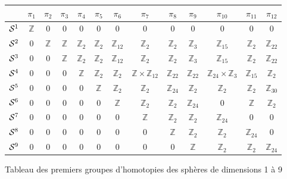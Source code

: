 \begin{figure}[H]
    \centering
    \small
    \begin{tabular}{|c|c|c|c|c|c|c|c|c|c|c|c|c|}
\hline
 & $\pi_1$ & $\pi_2$ & $\pi_3$ & $\pi_4$ & $\pi_5$ & $\pi_6$ & $\pi_7$ & $\pi_8$ & $\pi_9$ & $\pi_{10}$ & $\pi_{11}$ & $\pi_{12}$ \\
\hline
$\mathcal{S}^{1}$ & $\mathbb{Z}$ & $0$ & $0$ & $0$ & $0$ & $0$ & $0$ & $0$ & $0$ & $0$ & $0$ & $0$\\
\hline
$\mathcal{S}^{2}$ & $0$ & $\mathbb{Z}$ & $\mathbb{Z}$ & $\mathbb{Z}_2$ & $\mathbb{Z}_2$ & $\mathbb{Z}_{12}$ & $\mathbb{Z}_2$ & $\mathbb{Z}_2$ & $\mathbb{Z}_3$ & $\mathbb{Z}_{15}$ & $\mathbb{Z}_2$ & $\mathbb{Z}_{22}$ \\
\hline
$\mathcal{S}^{3}$ & $0$ & $0$ & $\mathbb{Z}$ & $\mathbb{Z}_2$ & $\mathbb{Z}_2$ & $\mathbb{Z}_{12}$ & $\mathbb{Z}_2$ & $\mathbb{Z}_2$ & $\mathbb{Z}_3$ & $\mathbb{Z}_{15}$ & $\mathbb{Z}_2$ & $\mathbb{Z}_{22}$ \\
\hline
$\mathcal{S}^{4}$ & $0$ & $0$ & $0$ & $\mathbb{Z}$ & $\mathbb{Z}_2$ & $\mathbb{Z}_2$ & $\mathbb{Z} \times \mathbb{Z}_{12}$ & $\mathbb{Z}_{22}$ & $\mathbb{Z}_{22}$ & $\mathbb{Z}_{24} \times \mathbb{Z}_3$ & $\mathbb{Z}_{15}$ & $\mathbb{Z}_2$ \\
\hline
$\mathcal{S}^{5}$ & $0$ & $0$ & $0$ & $0$ & $\mathbb{Z}$ & $\mathbb{Z}_2$ & $\mathbb{Z}_2$ & $\mathbb{Z}_{24}$ & $\mathbb{Z}_2$ & $\mathbb{Z}_2$ & $\mathbb{Z}_2$ & $\mathbb{Z}_{30}$ \\
\hline
$\mathcal{S}^{6}$ & $0$ & $0$ & $0$ & $0$ & $0$ & $\mathbb{Z}$ & $\mathbb{Z}_2$ & $\mathbb{Z}_2$ & $\mathbb{Z}_{24}$ & $0$ & $\mathbb{Z}$ & $\mathbb{Z}_2$ \\
\hline
$\mathcal{S}^{7}$ & $0$ & $0$ & $0$ & $0$ & $0$ & $0$ & $\mathbb{Z}$ & $\mathbb{Z}_2$ & $\mathbb{Z}_2$ & $\mathbb{Z}_{24}$ & $0$ & $0$ \\
\hline
$\mathcal{S}^{8}$ & $0$ & $0$ & $0$ & $0$ & $0$ & $0$ & $0$ & $\mathbb{Z}$ & $\mathbb{Z}_2$ & $\mathbb{Z}_2$ & $\mathbb{Z}_{24}$ & $0$ \\
\hline
$\mathcal{S}^{9}$ & $0$ & $0$ & $0$ & $0$ & $0$ & $0$ & $0$ & $0$ & $\mathbb{Z}$ & $\mathbb{Z}_2$ & $\mathbb{Z}_2$ & $\mathbb{Z}_{24}$ \\
\hline
\end{tabular}
    \caption{Tableau des premiers groupes d'homotopies des sphères de dimensions 1 à 9}
    \label{fig:homotopy-groups-spheres}
\end{figure}